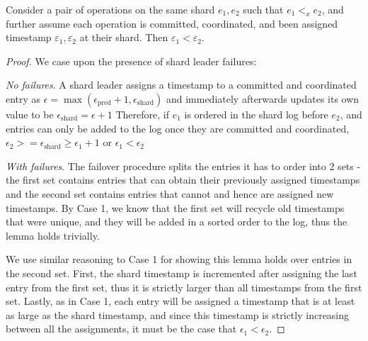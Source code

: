 \begin{lem}
\label{lemma2}
Consider a pair of operations on the same shard $e_1, e_2$ such that $e_1 <_x e_2$, and further assume each operation is committed, coordinated, and been assigned timestamp $\varepsilon_1, \varepsilon_2$ at their shard. Then $\varepsilon_1 < \varepsilon_2$.
\end{lem}
\begin{proof}
We case upon the presence of shard leader failures:

 \textit{No failures}.
A shard leader assigns a timestamp to a committed and coordinated entry as 
$\epsilon = \max(\epsilon_{\text{pred}} + 1, \epsilon_{\text{shard}})$ and immediately afterwards updates its own value to be 
$\epsilon_{\text{shard}} = \epsilon + 1$
Therefore, if $e_1$ is ordered in the shard log before $e_2$, and entries can only be added to the log once they are committed and coordinated, 
$\epsilon_2 >= \epsilon_{\text{shard}} \geq \epsilon_1 + 1$ or
$\epsilon_1 < \epsilon_2$

 \textit{With failures}.
The failover procedure splits the entries it has to order into 2 sets - the first set contains entries that can obtain their previously assigned timestamps and the second set contains entries that cannot and hence are assigned new timestamps. By Case 1, we know that the first set will recycle old timestamps that were unique, and they will be added in a sorted order to the log, thus the lemma holds trivially.

We use similar reasoning to Case 1 for showing this lemma holds over entries in the second set. First, the shard timestamp is incremented after assigning the last entry from the first set, thus it is strictly larger than all timestamps from the first set. Lastly, as in Case 1, each entry will be assigned a timestamp that is at least as large as the shard timestamp, and since this timestamp is strictly increasing between all the assignments, it must be the case that $\epsilon_1 < \epsilon_2$.




\end{proof}
